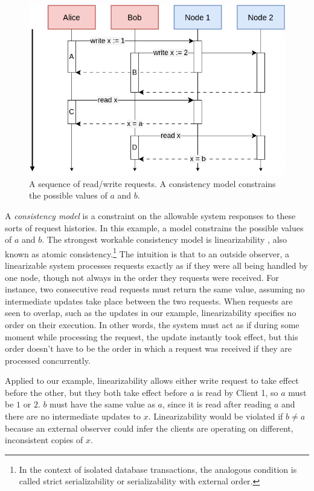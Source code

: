 \begin{figure}
  \includegraphics[scale=0.6]{images/Requests.png}
  \caption{A sequence of read/write requests. A consistency model constrains the possible values of $a$ and $b$.}
\end{figure}

A \emph{consistency model} is a constraint on the allowable system
responses to these sorts of request histories. In this example, a
model constrains the possible values of $a$ and $b$. The strongest
workable consistency model is linearizability
\cite{10.1145/78969.78972}, also known as atomic
consistency.\footnote{In the context of isolated database
transactions, the analogous condition is called strict serializability
or serializability with external order.} The intuition is that to an
outside observer, a linearizable system processes requests exactly as
if they were all being handled by one node, though not always in the
order they requests were received. For instance, two consecutive read
requests must return the same value, assuming no intermediate updates
take place between the two requests. When requests are seen to
overlap, such as the updates in our example, linearizability specifies
no order on their execution. In other words, the system must act as if
during some moment while processing the request, the update instantly
took effect, but this order doesn't have to be the order in which a
request was received if they are processed concurrently.

Applied to our example, linearizability allows either write request to
take effect before the other, but they both take effect before $a$ is
read by Client 1, so $a$ must be $1$ or $2$. $b$ must have the same
value as $a$, since it is read after reading $a$ and there are no
intermediate updates to $x$. Linearizability would be violated if $b
\neq a$ because an external observer could infer the clients are
operating on different, inconsistent copies of $x$.

